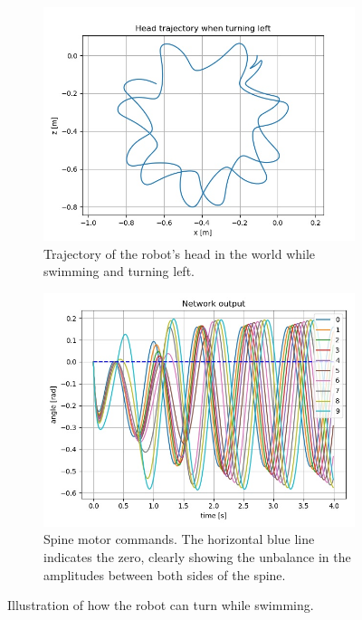 \documentclass{cmc}
\begin{document}
\begin{figure}[!ht]
  \begin{subfigure}[b]{0.48\textwidth}
    \includegraphics[width=\textwidth]{figures/9d/turning_left_trajectory.jpg}
    \caption{Trajectory of the robot's head in the world while swimming and turning left.}
    \label{fig:9d_turning_traj}
  \end{subfigure}
  \begin{subfigure}[b]{0.48\textwidth}
    \includegraphics[width=\textwidth]{figures/9d/turning_left_spine_angles.jpg}
    \caption{Spine motor commands. The horizontal blue line indicates the zero, clearly showing the unbalance in the amplitudes between both sides of the spine.}
    \label{fig:9d_turning_angles}
  \end{subfigure}
  \caption{Illustration of how the robot can turn while swimming.}
  \label{fig:9d_turning}
\end{figure}
\end{document}
